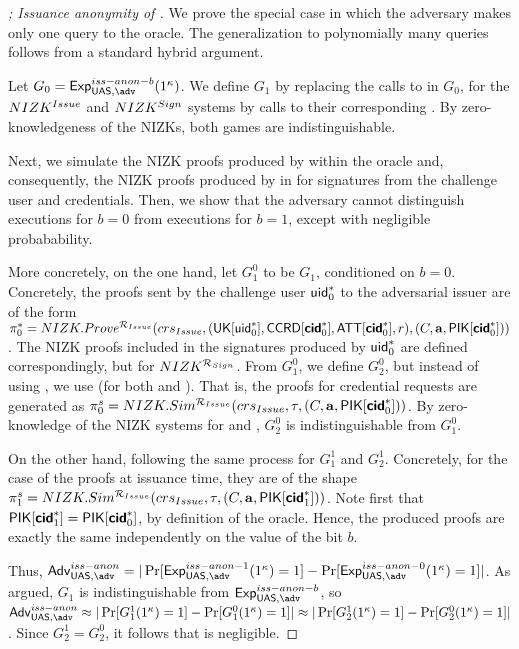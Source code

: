 \begin{proof}[; Issuance anonymity of \CUASGen]
  We prove the special case in which the adversary makes only one query to the
  \OBTCHALb oracle. The generalization to polynomially many queries follows from
  a standard hybrid argument.

  Let $G_0=\ExpIssAnonb(1^\secpar)$. We define $G_1$ by replacing the calls to
  \NIZKSetup in $G_0$, for the $NIZK^{Issue}$ and $NIZK^{Sign}$ systems by
  calls to their corresponding \NIZKSimSetup. By zero-knowledgeness of the
  NIZKs, both games are indistinguishable.

  Next, we simulate the NIZK proofs produced by \Obtain within the \OBTCHALb
  oracle and, consequently, the NIZK proofs produced by \Sign in \SIGN for
  signatures from the challenge user and credentials. Then, we show that the
  adversary cannot distinguish executions for $b=0$ from executions for $b=1$,
  except with negligible probabability.
  
  More concretely, on the one hand, let $G_1^0$ to be $G_1$, conditioned on
  $b=0$. Concretely, the proofs sent by the challenge user $\mathsf{uid}^*_0$ to the
  adversarial issuer are of
  the form $\pi^*_0 =NIZK.Prove^{\mathcal{R}_{Issue}}(crs_{Issue},(\mathsf{UK}[\mathsf{uid}^*_0],
  \mathsf{CCRD}[\boldsymbol{\mathsf{cid}}^*_0],\mathsf{ATT}[\boldsymbol{\mathsf{cid}}^*_0],r),(C,\mathbf{a},\mathsf{P}\mathsf{IK}[\boldsymbol{\mathsf{cid}}^*_0]))$. The
  NIZK proofs included in the signatures produced by $\mathsf{uid}^*_0$ are defined
  correspondingly, but for $NIZK^{\mathcal{R}_{Sign}}$. From $G_1^0$, we define
  $G_2^0$, but instead of using \NIZKProve, we use \NIZKSim (for both \Issue
  and \Sign). That is, the proofs for credential requests are generated as
  $\pi^s_0 =NIZK.Sim^{\mathcal{R}_{Issue}}(crs_{Issue},\tau,(C,\mathbf{a},
  \mathsf{P}\mathsf{IK}[\boldsymbol{\mathsf{cid}}^*_0]))$. By zero-knowledge of the NIZK systems for \Issue and
  \Sign, $G_2^0$ is indistinguishable from $G_1^0$.

  On the other hand, following the same process for $G_1^1$ and $G_2^1$.
  Concretely, for the case of the proofs at issuance time, they are of the
  shape $\pi^s_1 =NIZK.Sim^{\mathcal{R}_{Issue}}(crs_{Issue},\tau,(C,\mathbf{a},
  \mathsf{P}\mathsf{IK}[\boldsymbol{\mathsf{cid}}^*_1]))$. Note first that $\mathsf{P}\mathsf{IK}[\boldsymbol{\mathsf{cid}}^*_1] = \mathsf{P}\mathsf{IK}[\boldsymbol{\mathsf{cid}}^*_0]$,
  by definition of the \OBTCHALb oracle. Hence, the produced proofs are exactly
  the same independently on the value of the bit $b$.

  Thus, $\AdvIssAnon=|\Pr\lbrack
  \ExpIssAnono(1^\secpar)=1\rbrack-\Pr\lbrack\ExpIssAnonz(1^\secpar)=1\rbrack|$.
  As argued, $G_1$ is indistinguishable from $\ExpIssAnonb$, so
  $\AdvIssAnon \approx |\Pr\lbrack G_1^1(1^\secpar)=1\rbrack-\Pr\lbrack
  G_1^0(1^\secpar)=1\rbrack| \approx
  |\Pr\lbrack G_2^1(1^\secpar)=1\rbrack-\Pr\lbrack
  G_2^0(1^\secpar)=1\rbrack|$. Since $G_2^1=G_2^0$, it follows that
  \AdvIssAnon is negligible.
  
\end{proof}

